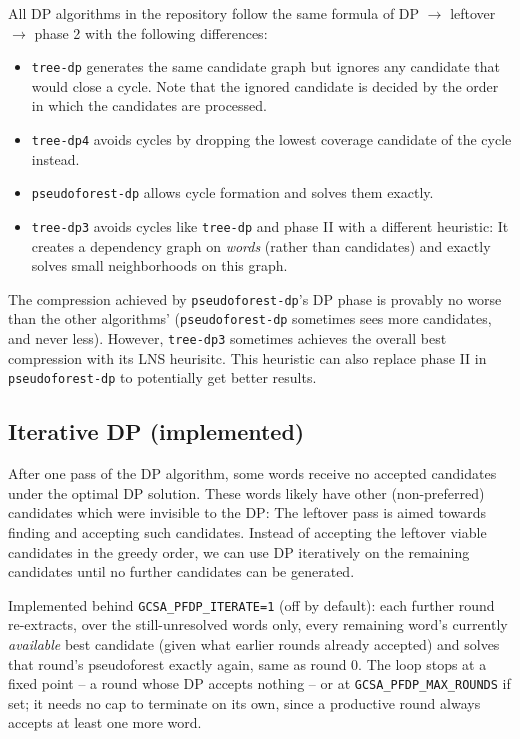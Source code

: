 \documentclass[11pt,a4paper]{article}
\begin{document}
All DP algorithms in the repository follow the same formula of DP $\rightarrow$ leftover $\rightarrow$ phase 2 with the following differences:
\begin{itemize}
    \item \texttt{tree-dp} generates the same candidate graph but ignores any candidate that would close a cycle. Note that the ignored candidate is decided by the order in which the candidates are processed.
    \item \texttt{tree-dp4} avoids cycles by dropping the lowest coverage candidate of the cycle instead.
    \item \texttt{pseudoforest-dp} allows cycle formation and solves them exactly.
    \item \texttt{tree-dp3} avoids cycles like \texttt{tree-dp} and phase II with a different heuristic: It creates a dependency graph on \emph{words} (rather than candidates) and exactly solves small neighborhoods on this graph.
\end{itemize}
The compression achieved by \texttt{pseudoforest-dp}'s DP phase is provably no worse than the other algorithms' (\texttt{pseudoforest-dp} sometimes sees more candidates, and never less). However, \texttt{tree-dp3} sometimes achieves the overall best compression with its LNS heurisitc. This heuristic can also replace phase II in \texttt{pseudoforest-dp} to potentially get better results.

\subsection{Iterative DP (implemented)}

After one pass of the DP algorithm, some words receive no accepted candidates under the optimal DP solution. These words likely have other (non-preferred) candidates which were invisible to the DP: The leftover pass is aimed towards finding and accepting such candidates. Instead of accepting the leftover viable candidates in the greedy order, we can use DP iteratively on the remaining candidates until no further candidates can be generated.

Implemented behind \texttt{GCSA\_PFDP\_ITERATE=1} (off by default): each further round re-extracts, over the still-unresolved words only, every remaining word's currently \emph{available} best candidate (given what earlier rounds already accepted) and solves that round's pseudoforest exactly again, same as round 0. The loop stops at a fixed point -- a round whose DP accepts nothing -- or at \texttt{GCSA\_PFDP\_MAX\_ROUNDS} if set; it needs no cap to terminate on its own, since a productive round always accepts at least one more word.
\end{document}
